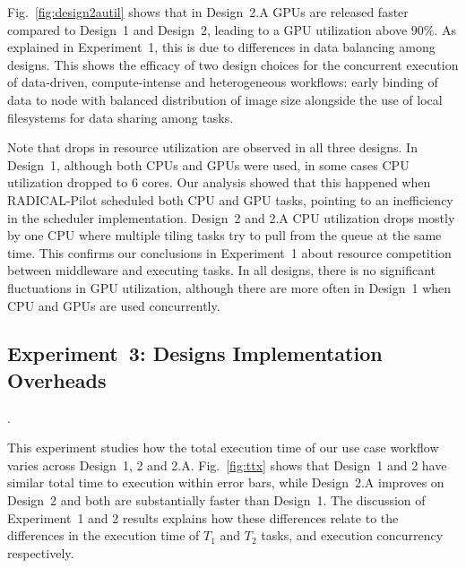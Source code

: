Fig.~\ref{fig:design2autil} shows that in Design~2.A GPUs are released faster compared to Design~1 and Design~2, leading to a GPU utilization above $90\%$.
As explained in Experiment~1, this is due to differences in data balancing among designs.
This shows the efficacy of two design choices for the concurrent execution of data-driven, compute-intense and heterogeneous workflows: early binding of data to node with balanced distribution of image size alongside the use of local filesystems for data sharing among tasks.

Note that drops in resource utilization are observed in all three designs.
In Design~1, although both CPUs and GPUs were used, in some cases CPU utilization dropped to 6 cores.
Our analysis showed that this happened when RADICAL-Pilot scheduled both CPU and GPU tasks, pointing to an inefficiency in the scheduler implementation.
Design~2 and 2.A CPU utilization drops mostly by one CPU where multiple tiling tasks try to pull from the queue at the same time.
This confirms our conclusions in Experiment~1 about resource competition between middleware and executing tasks.
In all designs, there is no significant fluctuations in GPU utilization, although there are more often in Design~1 when CPU and GPUs are used concurrently.

\subsection{Experiment~3: Designs Implementation Overheads}\label{ssec:exp3}. 

This experiment studies how the total execution time of our use case workflow varies across Design~1, 2 and 2.A. Fig.~\ref{fig:ttx} shows that Design~1 and 2 have similar total time to execution within error bars, while Design~2.A improves on Design~2 and both are substantially faster than Design~1.
The discussion of Experiment~1 and 2 results explains how these differences relate to the differences in the execution time of $T_{1}$ and $T_{2}$ tasks, and execution concurrency respectively.

